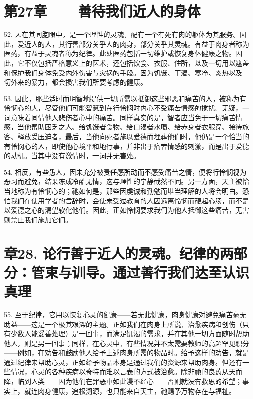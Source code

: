 
\section{第27章——善待我们近人的身体}

52. 人在其同胞眼中，是一个理性的灵魂，配有一个有死有肉的躯体为其服务。因此，爱近人的人，其行善部分关乎人的肉身，部分关乎其灵魂。有益于肉身者称为医药，有益于灵魂者称为纪律。此处医药包括一切维护或恢复身体健康之物。因此，它不仅包括严格意义上的医术，还包括饮食、衣服、住所，以及一切用以遮盖和保护我们身体免受内外伤害与灾祸的手段。因为饥饿、干渴、寒冷、炎热以及一切外来的暴力，都会损害我们所要考虑的健康。\par

53. 因此，那些适时而明智地提供一切所需以抵御这些邪恶和痛苦的人，被称为有怜悯心的人，尽管他们可能智慧到在行怜悯时内心不受痛苦情感的搅扰。无疑，一词意味着同情他人悲伤者心中的痛苦。同样真实的是，智者应当免于一切痛苦情感，当他帮助困乏之人、给饥饿者食物、给口渴者水喝、给赤身者衣服穿、接待旅客、释放受压迫者，最后，当他向死者施以爱德而埋葬他们时，他仍是一个恰当的有怜悯心的人，即使他心境平和地行事，并非出于痛苦情感的刺激，而是出于爱德的动机。当其中没有激情时，一词并无害处。\par

54. 相反，有些愚人，因未充分被责任感所动而不感受痛苦之情，便将行怜悯视为恶习而避免，结果冻成冷酷无情，这与理性的宁静截然不同。另一方面，天主被恰当地称为有怜悯心的；祂如何是，那些因虔诚和勤勉而堪当理解的人将会明白。恐怕我们在使用学者的言辞时，会使未受过教育的人因远离怜悯而硬起心肠，而不是以爱德之心的渴望软化他们。因此，正如怜悯要求我们为他人抵御这些痛苦，无害则禁止我们施加它们。\par


\section{章28. 论行善于近人的灵魂。纪律的两部分：管束与训导。通过善行我们达至认识真理}

55. 至于纪律，它用以恢复心灵的健康——若无此健康，肉身健康对避免痛苦毫无助益——这是一个极其艰深的主题。正如我们在肉身上所说，治愈疾病和创伤（只有少数人能妥善处理）是一回事，而满足饥渴的需求，并在其他一切方面随时帮助他人，则是另一回事；同样，在心灵中，有些情况并不太需要教师的高超罕见职分——例如，在劝告和鼓励他人给予上述肉身所需的物品时。给予这样的劝告，就是通过纪律来帮助心灵，正如给予物品本身是通过我们的资源来帮助肉身。但还有一些情况，心灵的各种疾病以奇特而难以言表的方式被治愈。除非祂的良药从天而降，临到人类——因为他们在罪恶中如此漫不经心——否则就没有救恩的希望；事实上，就连肉身健康，追根溯源，也只能来自天主，祂赐予万物存在与福祉。\par

